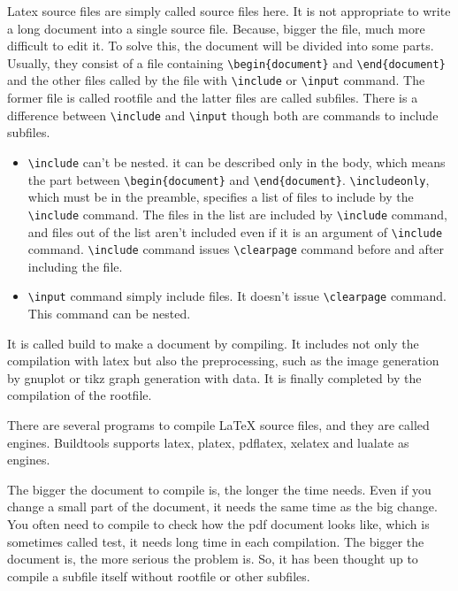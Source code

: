 Latex source files are simply called source files here. It is not
appropriate to write a long document into a single source file. Because,
bigger the file, much more difficult to edit it. To solve this, the
document will be divided into some parts. Usually, they consist of a
file containing \texttt{\textbackslash{}begin\{document\}} and
\texttt{\textbackslash{}end\{document\}} and the other files called by
the file with \texttt{\textbackslash{}include} or
\texttt{\textbackslash{}input} command. The former file is called
rootfile and the latter files are called subfiles. There is a difference
between \texttt{\textbackslash{}include} and
\texttt{\textbackslash{}input} though both are commands to include
subfiles.

\begin{itemize}
\item
  \texttt{\textbackslash{}include} can't be nested. it can be described
  only in the body, which means the part between
  \texttt{\textbackslash{}begin\{document\}} and
  \texttt{\textbackslash{}end\{document\}}.
  \texttt{\textbackslash{}includeonly}, which must be in the preamble,
  specifies a list of files to include by the
  \texttt{\textbackslash{}include} command. The files in the list are
  included by \texttt{\textbackslash{}include} command, and files out of
  the list aren't included even if it is an argument of
  \texttt{\textbackslash{}include} command.
  \texttt{\textbackslash{}include} command issues
  \texttt{\textbackslash{}clearpage} command before and after including
  the file.
\item
  \texttt{\textbackslash{}input} command simply include files. It
  doesn't issue \texttt{\textbackslash{}clearpage} command. This command
  can be nested.
\end{itemize}

It is called build to make a document by compiling. It includes not only
the compilation with latex but also the preprocessing, such as the image
generation by gnuplot or tikz graph generation with data. It is finally
completed by the compilation of the rootfile.

There are several programs to compile LaTeX source files, and they are
called engines. Buildtools supports latex, platex, pdflatex, xelatex and
lualate as engines.

The bigger the document to compile is, the longer the time needs. Even
if you change a small part of the document, it needs the same time as
the big change. You often need to compile to check how the pdf document
looks like, which is sometimes called test, it needs long time in each
compilation. The bigger the document is, the more serious the problem
is. So, it has been thought up to compile a subfile itself without
rootfile or other subfiles.

